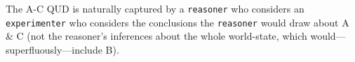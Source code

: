\documentclass[10pt,letterpaper]{article}
\begin{document}
The A-C QUD is naturally captured by a \lstinline{reasoner} who considers an \lstinline{experimenter} who considers the conclusions the \lstinline{reasoner} would draw about A \& C (not the reasoner's inferences about the whole world-state, which would---superfluously---include B).



\end{document}
